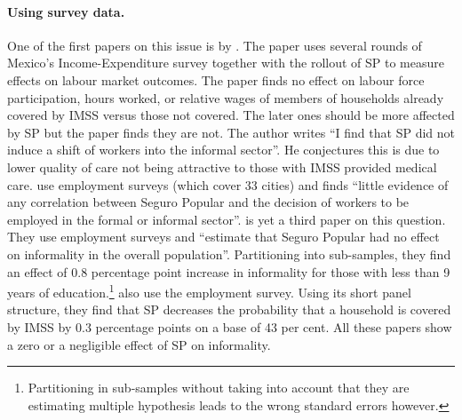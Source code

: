 \documentclass[oneside,11pt]{article}
\begin{document}
\paragraph{Using survey data.} One of the first papers on this issue is by \cite{Barros}. The paper uses several rounds of Mexico's Income-Expenditure survey together with the rollout of SP to measure effects on labour market outcomes. The paper finds no effect on labour force participation, hours worked, or relative wages of members of households already covered by IMSS versus those not covered. The later ones should be more affected by SP but the paper finds they are not. The author writes ``I find that SP did not induce a shift of workers into the informal sector''. He conjectures this is due to lower quality of care not being attractive to those with IMSS provided medical care. \cite{Knox} use employment surveys (which cover 33 cities) and finds ``little evidence of any correlation between Seguro Popular and the decision of workers to be employed in the formal or informal sector''. \cite{Azuara} is yet a third paper on this question. They use employment surveys and ``estimate that Seguro Popular had no effect on informality in the overall population''. Partitioning into sub-samples, they find an effect of 0.8 percentage point increase in informality for those with less than 9 years of education.\footnote{Partitioning in sub-samples without taking into account that they are estimating multiple hypothesis leads to the wrong standard errors however.} \cite{Pages} also use the employment survey. Using its short panel structure, they find that SP decreases the probability that a household is covered by IMSS by 0.3 percentage points on a base of 43 per cent.  All these papers show a zero or a negligible effect of SP on informality. 
\end{document}
